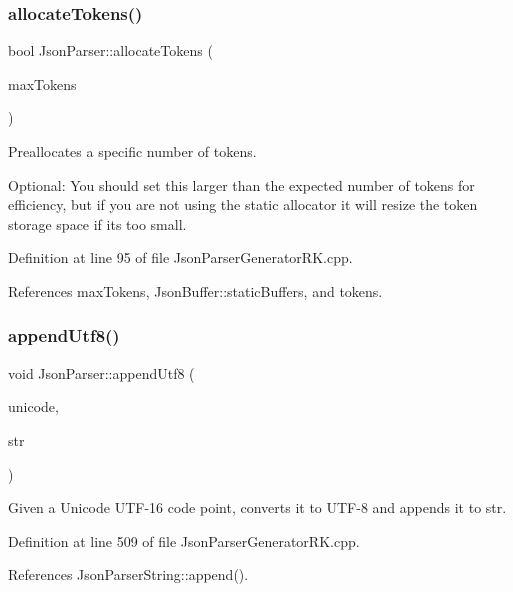 \subsubsection{\texorpdfstring{allocate\+Tokens()}{allocateTokens()}}
{\footnotesize\ttfamily bool Json\+Parser\+::allocate\+Tokens (\begin{DoxyParamCaption}\item[{size\+\_\+t}]{max\+Tokens }\end{DoxyParamCaption})}



Preallocates a specific number of tokens. 

Optional\+: You should set this larger than the expected number of tokens for efficiency, but if you are not using the static allocator it will resize the token storage space if it\textquotesingle{}s too small. 

Definition at line 95 of file Json\+Parser\+Generator\+R\+K.\+cpp.



References max\+Tokens, Json\+Buffer\+::static\+Buffers, and tokens.

\mbox{\label{class_json_parser_a498dcdec7949c88dfc454d052e25ff69}} 
\subsubsection{\texorpdfstring{append\+Utf8()}{appendUtf8()}}
{\footnotesize\ttfamily void Json\+Parser\+::append\+Utf8 (\begin{DoxyParamCaption}\item[{uint16\+\_\+t}]{unicode,  }\item[{\hyperlink{class_json_parser_string}{Json\+Parser\+String} \&}]{str }\end{DoxyParamCaption})\hspace{0.3cm}{\ttfamily [static]}}



Given a Unicode U\+T\+F-\/16 code point, converts it to U\+T\+F-\/8 and appends it to str. 



Definition at line 509 of file Json\+Parser\+Generator\+R\+K.\+cpp.



References Json\+Parser\+String\+::append().

